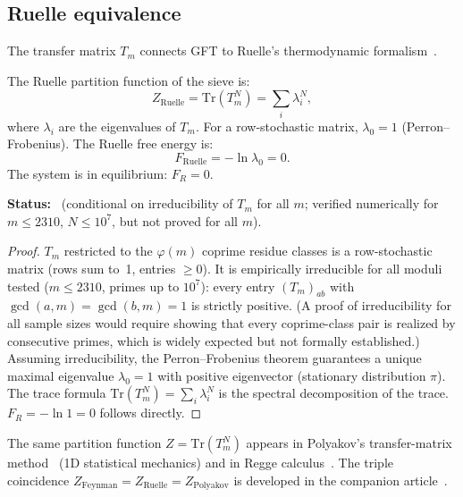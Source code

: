 \documentclass[12pt,a4paper]{article}
\begin{document}
\subsection{Ruelle equivalence}
\label{sec:ruelle}

The transfer matrix $T_m$ connects GFT to Ruelle's thermodynamic
formalism~\cite{Ruelle1978}.

\mID
\begin{idbox}
\label{id:ruelle}
The Ruelle partition function of the sieve is:
\begin{equation}
  Z_{\mathrm{Ruelle}} = \mathrm{Tr}(T_m^N) = \sum_i \lambda_i^N,
  \label{eq:ruelle}
\end{equation}
where $\lambda_i$ are the eigenvalues of $T_m$. For a row-stochastic
matrix, $\lambda_0 = 1$ (Perron--Frobenius). The Ruelle free energy is:
\begin{equation}
  F_{\mathrm{Ruelle}} = -\ln \lambda_0 = 0.
  \label{eq:ruelle_free}
\end{equation}
The system is in equilibrium: $F_R = 0$.

\medskip\noindent\textbf{Status:} \CONDTAG\ (conditional on irreducibility of $T_m$
for all $m$; verified numerically for $m \leq 2310$, $N \leq 10^7$,
but not proved for all $m$).

\begin{proof}
$T_m$ restricted to the $\varphi(m)$ coprime residue classes is a
row-stochastic matrix (rows sum to~1, entries $\geq 0$).
It is empirically irreducible for all moduli tested ($m \leq 2310$,
primes up to $10^7$): every entry $(T_m)_{ab}$ with $\gcd(a,m) = \gcd(b,m) = 1$
is strictly positive.
(A proof of irreducibility for all sample sizes would require showing
that every coprime-class pair is realized by consecutive primes, which
is widely expected but not formally established.)
Assuming irreducibility, the Perron--Frobenius theorem guarantees a
unique maximal eigenvalue $\lambda_0 = 1$ with positive eigenvector
(stationary distribution $\pi$).
The trace formula $\mathrm{Tr}(T_m^N) = \sum_i
\lambda_i^N$ is the spectral decomposition of the trace.
$F_R = -\ln 1 = 0$ follows directly.
\end{proof}
\end{idbox}

\begin{remark}
The same partition function $Z = \mathrm{Tr}(T_m^N)$ appears in
Polyakov's transfer-matrix method~\cite{Polyakov1981}
(1D statistical mechanics) and in Regge calculus~\cite{Regge1959}. The triple coincidence $Z_{\mathrm{Feynman}} =
Z_{\mathrm{Ruelle}} = Z_{\mathrm{Polyakov}}$ is developed in
the companion article~\cite{companion_M5}.
\end{remark}
\end{document}
